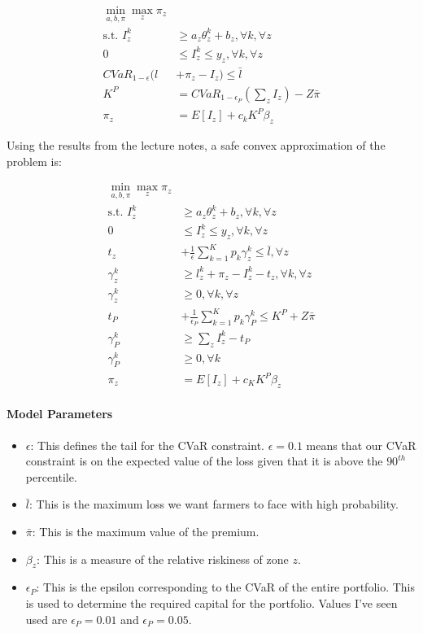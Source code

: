 \documentclass[11pt]{article}
\begin{document}
\begin{align}
    \min_{a,b,\pi} \max_z \pi_z\\
    \text{s.t.   } I_z^k &\geq a_z\theta^k_z +b_z, \forall k, \forall z\\
    0 &\leq I_z^k \leq y_z, \forall k, \forall z \\
    CVaR_{1-\epsilon}(l &+ \pi_z -I_z) \leq \bar{l} \\
    K^P &= CVaR_{1-\epsilon_P}\left (\sum_z I_z \right ) - Z\bar{\pi}\\
    \pi_z &= E[I_z]+c_k K^P \beta_z
\end{align}

Using the results from the lecture notes, a safe convex approximation of the problem is: 

\begin{align}
    \min_{a,b,\pi} \max_z \pi_z\\
    \text{s.t.   } I_z^k &\geq a_z\theta^k_z +b_z, \forall k, \forall z\\
    0 &\leq I_z^k \leq y_z, \forall k, \forall z \\
    t_z &+ \frac{1}{\epsilon} \sum_{k=1}^K p_k \gamma_z^k \leq \bar{l}, \forall z \\
    \gamma_z^k &\geq l_z^k + \pi_z -I_z^k -t_z, \forall k, \forall z\\
    \gamma_z^k &\geq 0, \forall k, \forall z\\
    t_P &+ \frac{1}{\epsilon_P} \sum_{k=1}^K p_k \gamma_P^k \leq K^P + Z \bar{\pi}\\
    \gamma_P^k &\geq \sum_z I_z^k -t_P\\
    \gamma_P^k &\geq 0, \forall k\\
    \pi_z &= E[I_z]+c_K K^P\beta_z
\end{align}

\paragraph*{Model Parameters}
\begin{itemize}
    \item $\epsilon$: This defines the tail for the CVaR constraint. $\epsilon = 0.1$ means that our CVaR constraint is on the expected value of the loss given that it is above the $90^{th}$ percentile. 
    \item $\bar{l}$: This is the maximum loss we want farmers to face with high probability.
    \item $\bar{\pi}$: This is the maximum value of the premium. 
    \item $\beta_z$: This is a measure of the relative riskiness of zone $z$. 
    \item $\epsilon_P$: This is the epsilon corresponding to the CVaR of the entire portfolio. This is used to determine the required capital for the portfolio. Values I've seen used are $\epsilon_P=0.01$ and $\epsilon_P=0.05$. 
\end{itemize}



\printbibliography
\end{document}
